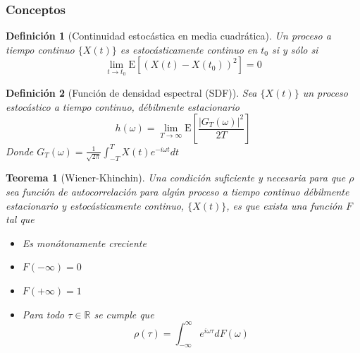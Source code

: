\documentclass{beamer}
\newtheorem{defn}{Definici\'on}
\newtheorem{thrm}{Teorema}
\newcommand{\R}{\mathbb{R}}
\newcommand{\intR}{\int_{-\infty}^{\infty}}
\newcommand{\E}[1]{\mathrm{E}\left[ #1 \right]}
\begin{document}

\begin{frame}\frametitle{Conceptos}
\begin{defn}[Continuidad estoc\'astica en media cuadr\'atica]
Un proceso a tiempo continuo $\{ X(t) \}$ es estoc\'asticamente continuo en $t_0$ si y s\'olo si
\begin{equation*}
\lim_{t \rightarrow t_0} \E{\left( X\left(t\right) - X\left(t_0\right) \right)^{2}} = 0
\end{equation*}
\end{defn}

\begin{defn}[Funci\'on de densidad espectral (SDF)]
Sea $\{X(t)\}$ un proceso estoc\'astico a tiempo continuo, d\'ebilmente estacionario
\begin{equation*}
h(\omega) = \lim_{T\rightarrow \infty} \E{ \frac{ \left| G_T(\omega) \right|^{2}}{2 T} }
\end{equation*}
Donde $\displaystyle G_T (\omega) = \frac{1}{\sqrt{2 \pi}} \int_{-T}^{T} X(t) e^{-i \omega t} dt$
\end{defn}
\end{frame}


\begin{frame}%
\begin{thrm}[Wiener-Khinchin]
Una condici\'on suficiente y necesaria para que $\rho$ sea funci\'on de autocorrelaci\'on para 
alg\'un proceso a tiempo continuo d\'ebilmente estacionario y estoc\'asticamente continuo, 
$\{X(t)\}$,  es que exista una funci\'on $F$ tal que
\begin{itemize}
\item Es mon\'otonamente creciente
\item $F(-\infty) = 0$
\item $F(+\infty) = 1$
\item Para todo $\tau \in \R$ se cumple que
\begin{equation*}
\rho(\tau) = \intR e^{i \omega \tau} dF(\omega)
\end{equation*}
\end{itemize}
\end{thrm}
\end{frame}

\end{document}
